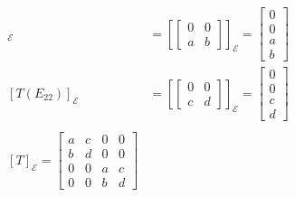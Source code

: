 \documentclass[12pt]{exam}
\begin{document}
\begin{questions}
\begin{parts}
\begin{solution}
\begin{align*}
                [T(E_{21})]_\mathcal E &= \left[\begin{bmatrix*} 0 & 0 \\ a & b \end{bmatrix*}\right]_\mathcal E = \begin{bmatrix} 0 \\ 0 \\ a \\ b \end{bmatrix} \\
                [T(E_{22})]_\mathcal E &= \left[\begin{bmatrix*} 0 & 0 \\ c & d \end{bmatrix*}\right]_\mathcal E = \begin{bmatrix} 0 \\ 0 \\ c \\ d \end{bmatrix} \\\\
                [T]_\mathcal E = \begin{bmatrix} a & c & 0 & 0 \\ b & d & 0 & 0 \\ 0 & 0 & a & c \\ 0 & 0 & b & d \end{bmatrix}
            \end{align*}
        \end{solution}

\end{parts}
\end{questions}
\end{document}

